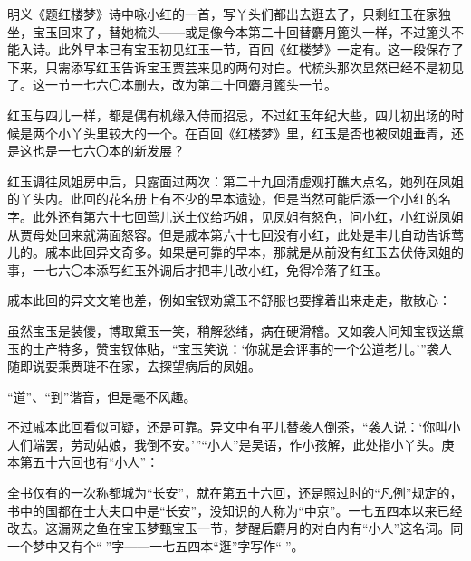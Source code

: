 \par 明义《题红楼梦》诗中咏小红的一首，写丫头们都出去逛去了，只剩红玉在家独坐，宝玉回来了，替她梳头——或是像今本第二十回替麝月篦头一样，不过篦头不能入诗。此外早本已有宝玉初见红玉一节，百回《红楼梦》一定有。这一段保存了下来，只需添写红玉告诉宝玉贾芸来见的两句对白。代梳头那次显然已经不是初见了。这一节一七六〇本删去，改为第二十回麝月篦头一节。
\par 红玉与四儿一样，都是偶有机缘入侍而招忌，不过红玉年纪大些，四儿初出场的时候是两个小丫头里较大的一个。在百回《红楼梦》里，红玉是否也被凤姐垂青，还是这也是一七六〇本的新发展？
\par 红玉调往凤姐房中后，只露面过两次：第二十九回清虚观打醮大点名，她列在凤姐的丫头内。此回的花名册上有不少的早本遗迹，但是当然可能后添一个小红的名字。此外还有第六十七回莺儿送土仪给巧姐，见凤姐有怒色，问小红，小红说凤姐从贾母处回来就满面怒容。但是戚本第六十七回没有小红，此处是丰儿自动告诉莺儿的。戚本此回异文奇多。如果是可靠的早本，那就是从前没有红玉去伏侍凤姐的事，一七六〇本添写红玉外调后才把丰儿改小红，免得冷落了红玉。
\par 戚本此回的异文文笔也差，例如宝钗劝黛玉不舒服也要撑着出来走走，散散心：
\par 虽然宝玉是装傻，博取黛玉一笑，稍解愁绪，病在硬滑稽。又如袭人问知宝钗送黛玉的土产特多，赞宝钗体贴，“宝玉笑说：‘你就是会评事的一个公道老儿。'”袭人随即说要乘贾琏不在家，去探望病后的凤姐。
\par “道”、“到”谐音，但是毫不风趣。
\par 不过戚本此回看似可疑，还是可靠。异文中有平儿替袭人倒茶，“袭人说：‘你叫小人们端罢，劳动姑娘，我倒不安。'”“小人”是吴语，作小孩解，此处指小丫头。庚本第五十六回也有“小人”：
\par 全书仅有的一次称都城为“长安”，就在第五十六回，还是照过时的“凡例”规定的，书中的国都在士大夫口中是“长安”，没知识的人称为“中京”。一七五四本以来已经改去。这漏网之鱼在宝玉梦甄宝玉一节，梦醒后麝月的对白内有“小人”这名词。同一个梦中又有个“𤞘”字——一七五四本“逛”字写作“𤞘”。
